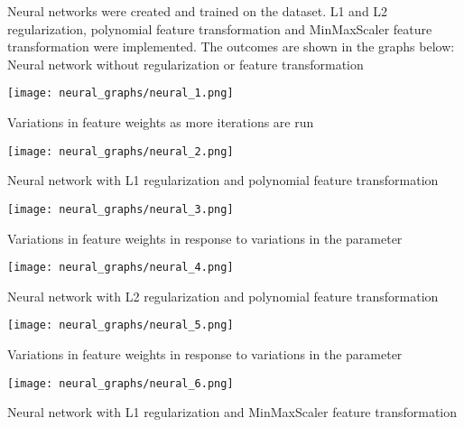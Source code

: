 \documentclass[12pt]{article}
\begin{document}
\begin{enumerate}
		Neural networks were created and trained on the dataset. L1 and L2 regularization, polynomial feature transformation and MinMaxScaler feature transformation were implemented. The outcomes are shown in the graphs below:\\
		
		Neural network without regularization or feature transformation\\
		
		\begin{center}
			\texttt{[image: neural\_graphs/neural\_1.png]}
		\end{center}
		
		Variations in feature weights as more iterations are run\\
		
		\begin{center}
			\texttt{[image: neural\_graphs/neural\_2.png]}
		\end{center}
		
		Neural network with L1 regularization and polynomial feature transformation\\
		
		\begin{center}
			\texttt{[image: neural\_graphs/neural\_3.png]}
		\end{center}
		
		Variations in feature weights in response to variations in the parameter\\
		
		\begin{center}
			\texttt{[image: neural\_graphs/neural\_4.png]}
		\end{center}
		
		Neural network with L2 regularization and polynomial feature transformation\\
		
		\begin{center}
			\texttt{[image: neural\_graphs/neural\_5.png]}
		\end{center}
		
		Variations in feature weights in response to variations in the parameter\\
		
		\begin{center}
			\texttt{[image: neural\_graphs/neural\_6.png]}
		\end{center}
		
		Neural network with L1 regularization and MinMaxScaler feature transformation\\
		

\end{enumerate}
\end{document}
